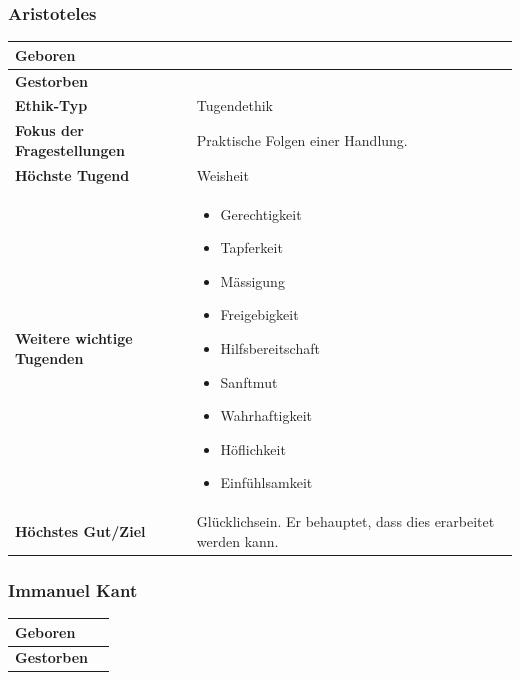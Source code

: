 			
		\subsubsection{Aristoteles}
			\begin{longtable}{>{\bfseries}p{}p{}}
				\hline
				Geboren
					& \\
				\hline
				Gestorben
					& \\
				\hline
				Ethik-Typ
					& Tugendethik\\
				\hline
				Fokus der Fragestellungen
					& Praktische Folgen einer Handlung.\\
				\hline
				Höchste Tugend
					& Weisheit\\
				\hline
				Weitere wichtige Tugenden
					&	
					\begin{itemize}
						\item Gerechtigkeit
						\item Tapferkeit
						\item Mässigung
						\item Freigebigkeit
						\item Hilfsbereitschaft
						\item Sanftmut
						\item Wahrhaftigkeit
						\item Höflichkeit
						\item Einfühlsamkeit
					\end{itemize}\\
				\hline
				Höchstes Gut/Ziel
					& Glücklichsein. Er behauptet, dass dies erarbeitet werden kann.\\
				\hline
			\end{longtable}	
		
		\subsubsection{Immanuel Kant}
			\begin{longtable}{>{\bfseries}p{}p{}}
				\hline
				Geboren
					& \\
				\hline
				Gestorben
					& \\
				\hline
			\end{longtable}	

